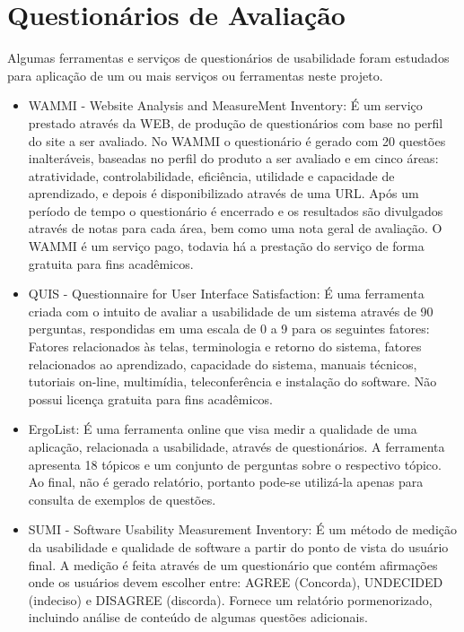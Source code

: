 \chapter{Questionários de Avaliação}
\label{questionarios}
Algumas ferramentas e serviços de questionários de usabilidade foram estudados para aplicação de um ou mais serviços ou ferramentas neste projeto.

\begin{itemize}
 \item WAMMI - Website Analysis and MeasureMent Inventory: É um serviço prestado através da WEB, de produção de questionários com base no perfil do site a ser avaliado. 
 No WAMMI o questionário é gerado com 20 questões inalteráveis, baseadas no perfil do produto a ser avaliado e em cinco áreas: atratividade, controlabilidade, eficiência, 
 utilidade e capacidade de aprendizado, e depois é disponibilizado através de uma URL. Após um período de tempo o questionário é encerrado e os resultados são divulgados 
 através de notas para cada área, bem como uma nota geral de avaliação. O WAMMI é um serviço pago, todavia há a prestação do serviço de forma gratuita para fins acadêmicos. 

 \item QUIS - Questionnaire for User Interface Satisfaction: É uma ferramenta criada com o intuito de avaliar a usabilidade de um sistema através de 90 perguntas,
 respondidas em uma escala de 0 a 9 para os seguintes fatores: Fatores relacionados às telas, terminologia e retorno do sistema, fatores relacionados ao aprendizado, 
 capacidade do sistema, manuais técnicos, tutoriais on-line, multimídia, teleconferência e instalação do software. Não possui licença gratuita para fins acadêmicos.

 \item ErgoList: É uma ferramenta online que visa medir a qualidade de uma aplicação, relacionada a usabilidade, através de questionários. 
 A ferramenta apresenta 18 tópicos e um conjunto de perguntas sobre o respectivo tópico. Ao final, não é gerado relatório, portanto pode-se utilizá-la 
 apenas para consulta de exemplos de questões. 
 
 \item SUMI - Software Usability Measurement Inventory: É um método de medição da usabilidade e qualidade de software a partir do ponto de vista do usuário final.
 A medição é feita através de um questionário que contém afirmações onde os usuários devem escolher entre: AGREE (Concorda), UNDECIDED (indeciso) e DISAGREE (discorda). 
 Fornece um relatório pormenorizado, incluindo análise de conteúdo de algumas questões adicionais. 


\end{itemize}
